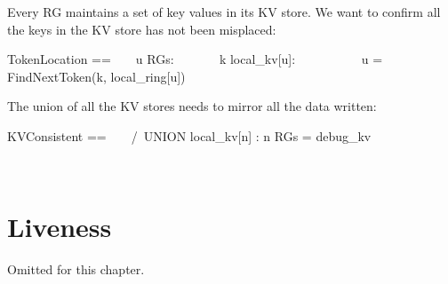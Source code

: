 Every RG maintains a set of key values in its KV store. We want to confirm all the keys 
in the KV store has not been misplaced:\\

\begin{tla}
TokenLocation == 
    \A u \in RGs:
        \A k \in local_kv[u]: 
            u = FindNextToken(k, local_ring[u])
\end{tla}
\begin{tlatex}
%
%
%
%
\end{tlatex}

The union of all the KV stores needs to mirror all the data written:\\

\begin{tla}
KVConsistent == 
    /\ UNION {local_kv[n] : n \in RGs} = debug_kv
\end{tla}
\begin{tlatex}
%
\end{tlatex}

\section{Liveness}

Omitted for this chapter.

% 
